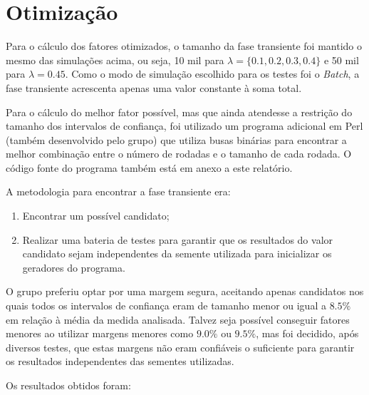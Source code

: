 \documentclass[a4paper,10pt]{article}
\begin{document}
\section{Otimização}

    Para o cálculo dos fatores otimizados, o tamanho da fase transiente foi mantido o mesmo das simulações acima, ou seja, 10 mil para $\lambda = \{0.1, 0.2, 0.3, 0.4 \}$ e 50 mil para $\lambda = 0.45$. Como o modo de simulação escolhido para os testes foi o \emph{Batch}, a fase transiente acrescenta apenas uma valor constante à soma total.

    Para o cálculo do melhor fator possível, mas que ainda atendesse a restrição do tamanho dos intervalos de confiança, foi utilizado um programa adicional em Perl (também desenvolvido pelo grupo) que utiliza busas binárias para encontrar a melhor combinação entre o número de rodadas e o tamanho de cada rodada. O código fonte do programa também está em anexo a este relatório.

A metodologia para encontrar a fase transiente era:
\begin{enumerate}
	\item Encontrar um possível candidato;
	\item Realizar uma bateria de testes para garantir que os resultados do valor candidato sejam independentes da semente utilizada para inicializar os geradores do programa.
\end{enumerate}

    O grupo preferiu optar por uma margem segura, aceitando apenas candidatos nos quais todos os intervalos de confiança eram de tamanho menor ou igual a $8.5\%$ em relação à média da medida analisada. Talvez seja possível conseguir fatores menores ao utilizar margens menores como $9.0\%$ ou $9.5\%$, mas foi decidido, após diversos testes, que estas margens não eram confiáveis o suficiente para garantir os resultados independentes das sementes utilizadas.

Os resultados obtidos foram:
\end{document}
